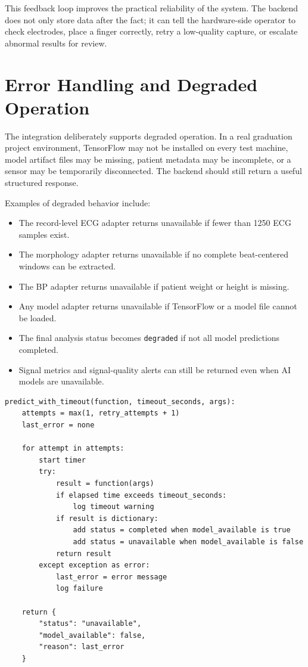 This feedback loop improves the practical reliability of the system. The backend does not only store data after the fact; it can tell the hardware-side operator to check electrodes, place a finger correctly, retry a low-quality capture, or escalate abnormal results for review.

\section{Error Handling and Degraded Operation}

The integration deliberately supports degraded operation. In a real graduation project environment, TensorFlow may not be installed on every test machine, model artifact files may be missing, patient metadata may be incomplete, or a sensor may be temporarily disconnected. The backend should still return a useful structured response.

Examples of degraded behavior include:

\begin{itemize}
    \item The record-level ECG adapter returns unavailable if fewer than 1250 ECG samples exist.
    \item The morphology adapter returns unavailable if no complete beat-centered windows can be extracted.
    \item The BP adapter returns unavailable if patient weight or height is missing.
    \item Any model adapter returns unavailable if TensorFlow or a model file cannot be loaded.
    \item The final analysis status becomes \texttt{degraded} if not all model predictions completed.
    \item Signal metrics and signal-quality alerts can still be returned even when AI models are unavailable.
\end{itemize}

\begin{lstlisting}[caption={Pseudocode for model call retry and unavailable status}]
predict_with_timeout(function, timeout_seconds, args):
    attempts = max(1, retry_attempts + 1)
    last_error = none

    for attempt in attempts:
        start timer
        try:
            result = function(args)
            if elapsed time exceeds timeout_seconds:
                log timeout warning
            if result is dictionary:
                add status = completed when model_available is true
                add status = unavailable when model_available is false
            return result
        except exception as error:
            last_error = error message
            log failure

    return {
        "status": "unavailable",
        "model_available": false,
        "reason": last_error
    }
\end{lstlisting}

